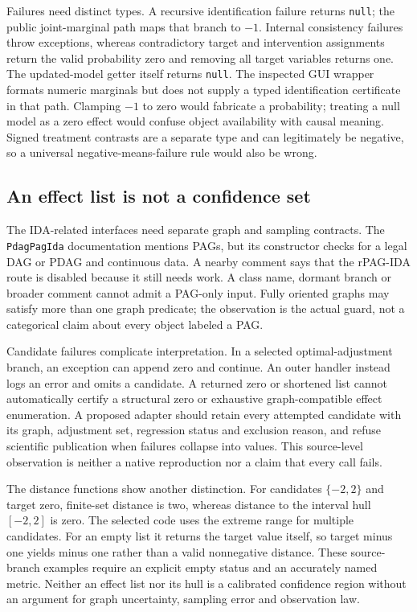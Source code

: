 Failures need distinct types. A recursive identification failure returns
\texttt{null}; the public joint-marginal path maps that branch to $-1$.
Internal consistency failures throw exceptions, whereas contradictory target
and intervention assignments return the valid probability zero and removing
all target variables returns one. The updated-model getter itself returns
\texttt{null}. The inspected GUI wrapper formats numeric marginals but does
not supply a typed identification certificate in that path. Clamping $-1$ to
zero would fabricate a probability; treating a null model as a zero effect
would confuse object availability with causal meaning. Signed treatment
contrasts are a separate type and can legitimately be negative, so a universal
negative-means-failure rule would also be wrong.~\citep{exec19_javaid_source}

\subsection{An effect list is not a confidence set}
\label{exec19:javaid-candidates}

The IDA-related interfaces need separate graph and sampling contracts.
The \texttt{PdagPagIda} documentation mentions PAGs, but its constructor checks
for a legal DAG or PDAG and continuous data. A nearby comment says that the
rPAG-IDA route is disabled because it still needs work. A class name, dormant
branch or broader comment cannot admit a PAG-only input. Fully oriented graphs
may satisfy more than one graph predicate; the observation is the actual guard,
not a categorical claim about every object labeled a PAG.
\citep{exec19_javaid_source}

Candidate failures complicate interpretation. In a selected optimal-adjustment
branch, an exception can append zero and continue. An outer handler instead
logs an error and omits a candidate. A returned zero or shortened list cannot
automatically certify a structural zero or exhaustive graph-compatible effect
enumeration. A proposed adapter should retain every attempted candidate with
its graph, adjustment set, regression status and exclusion reason, and refuse
scientific publication when failures collapse into values. This source-level
observation is neither a native reproduction nor a claim that every call fails.
\citep{exec19_javaid_source}

The distance functions show another distinction. For candidates $\{-2,2\}$
and target zero, finite-set distance is two, whereas distance to the interval
hull $[-2,2]$ is zero. The selected code uses the extreme range for multiple
candidates. For an empty list it returns the target value itself, so target
minus one yields minus one rather than a valid nonnegative distance. These
source-branch examples require an explicit empty status and an accurately named
metric. Neither an effect list nor its hull is a calibrated confidence region
without an argument for graph uncertainty, sampling error and observation law.
\citep{exec19_javaid_source,exec19_javaid_reference}

